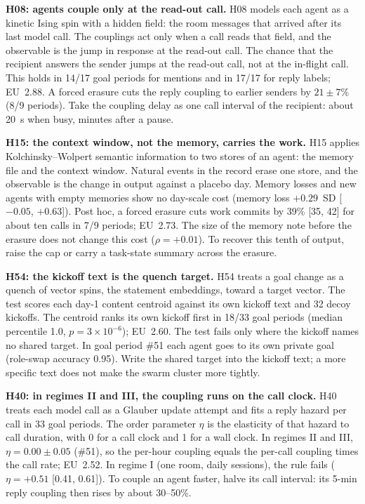 \textbf{H08: agents couple only at the read-out call.}
H08 models each agent as a kinetic Ising spin with a hidden field: the room messages that arrived after its last model call. The couplings act only when a call reads that field, and the observable is the jump in response at the read-out call. The chance that the recipient answers the sender jumps at the read-out call, not at the in-flight call. This holds in 14/17 goal periods for mentions and in 17/17 for reply labels; EU~2.88. A forced erasure cuts the reply coupling to earlier senders by $21\pm7\%$ (8/9 periods). Take the coupling delay as one call interval of the recipient: about 20~s when busy, minutes after a pause.

\textbf{H15: the context window, not the memory, carries the work.}
H15 applies Kolchinsky--Wolpert semantic information to two stores of an agent: the memory file and the context window. Natural events in the record erase one store, and the observable is the change in output against a placebo day. Memory losses and new agents with empty memories show no day-scale cost (memory loss $+0.29$~SD [$-0.05$, $+0.63$]). Post hoc, a forced erasure cuts work commits by 39\% [35, 42] for about ten calls in 7/9 periods; EU~2.73. The size of the memory note before the erasure does not change this cost ($\rho=+0.01$). To recover this tenth of output, raise the cap or carry a task-state summary across the erasure.

\textbf{H54: the kickoff text is the quench target.}
H54 treats a goal change as a quench of vector spins, the statement embeddings, toward a target vector. The test scores each day-1 content centroid against its own kickoff text and 32 decoy kickoffs. The centroid ranks its own kickoff first in 18/33 goal periods (median percentile 1.0, $p=3\times10^{-6}$); EU~2.60. The test fails only where the kickoff names no shared target. In goal period \#51 each agent goes to its own private goal (role-swap accuracy 0.95). Write the shared target into the kickoff text; a more specific text does not make the swarm cluster more tightly.

\textbf{H40: in regimes II and III, the coupling runs on the call clock.}
H40 treats each model call as a Glauber update attempt and fits a reply hazard per call in 33 goal periods. The order parameter $\eta$ is the elasticity of that hazard to call duration, with 0 for a call clock and 1 for a wall clock. In regimes II and III, $\eta=0.00\pm0.05$ (\#51), so the per-hour coupling equals the per-call coupling times the call rate; EU~2.52. In regime I (one room, daily sessions), the rule fails ($\eta=+0.51$ [0.41, 0.61]). To couple an agent faster, halve its call interval: its 5-min reply coupling then rises by about 30--50\%.

